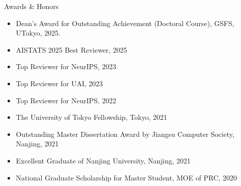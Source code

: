 \documentclass{resume} %
\begin{document}







\begin{rSection}{Awards \& Honors}
\begin{itemize}[leftmargin=*]
\item Dean's Award for Outstanding Achievement (Doctoral Course), GSFS, UTokyo, 2025.	
\item AISTATS 2025 Best Reviewer, 2025
\item Top Reviewer for NeurIPS, 2023
\item Top Reviewer for UAI, 2023
\item Top Reviewer for NeurIPS, 2022
\item The University of Tokyo Fellowship, Tokyo, 2021
\item Outstanding Master Dissertation Award by Jiangsu Computer Society, Nanjing, 2021
\item Excellent Graduate of Nanjing University, Nanjing, 2021
\item National Graduate Scholarship for Master Student, MOE of PRC, 2020
\end{itemize}
\end{rSection}
\end{document}
